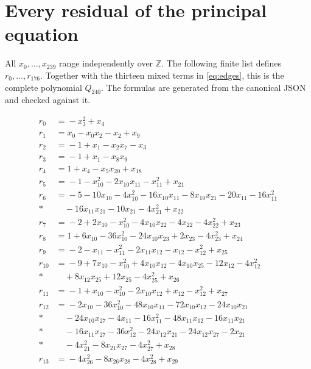 \documentclass[11pt]{article}
\theoremstyle{remark}\newtheorem{remark}[theorem]{Remark}
\newcommand{\Z}{\mathbb Z}
\begin{document}
\appendix
\section{Every residual of the principal equation}\label{app:residuals}

All $x_0,\ldots,x_{239}$ range independently over $\Z$.
The following finite list defines $r_0,\ldots,r_{176}$.
Together with the thirteen mixed terms in \eqref{eq:edges}, this is
the complete polynomial $Q_{240}$. The formulas are generated from
the canonical JSON and checked against it.

\begingroup\footnotesize
\setlength{\jot}{3pt}
\begin{align*}
r_{0}&={}-x_{3}^{2}+x_{4}\\[2pt]
r_{1}&={}x_{0}-x_{0}x_{2}-x_{2}+x_{9}\\[2pt]
r_{2}&={}-1+x_{1}-x_{2}x_{7}-x_{3}\\[2pt]
r_{3}&={}-1+x_{1}-x_{8}x_{9}\\[2pt]
r_{4}&={}1+x_{4}-x_{5}x_{20}+x_{18}\\[2pt]
r_{5}&={}-1-x_{10}^{2}-2x_{10}x_{11}-x_{11}^{2}+x_{21}\\[2pt]
r_{6}&={}-5-10x_{10}-4x_{10}^{2}-16x_{10}x_{11}-8x_{10}x_{21}-20x_{11}-16x_{11}^{2}\\*
&\quad{}-16x_{11}x_{21}-10x_{21}-4x_{21}^{2}+x_{22}\\[2pt]
r_{7}&={}-2+2x_{10}-x_{10}^{2}-4x_{10}x_{22}-4x_{22}-4x_{22}^{2}+x_{23}\\[2pt]
r_{8}&={}1+6x_{10}-36x_{10}^{2}-24x_{10}x_{23}+2x_{23}-4x_{23}^{2}+x_{24}\\[2pt]
r_{9}&={}-2-x_{11}-x_{11}^{2}-2x_{11}x_{12}-x_{12}-x_{12}^{2}+x_{25}\\[2pt]
r_{10}&={}-9+7x_{10}-x_{10}^{2}+4x_{10}x_{12}-4x_{10}x_{25}-12x_{12}-4x_{12}^{2}\\*
&\quad{}+8x_{12}x_{25}+12x_{25}-4x_{25}^{2}+x_{26}\\[2pt]
r_{11}&={}-1+x_{10}-x_{10}^{2}-2x_{10}x_{12}+x_{12}-x_{12}^{2}+x_{27}\\[2pt]
r_{12}&={}-2x_{10}-36x_{10}^{2}-48x_{10}x_{11}-72x_{10}x_{12}-24x_{10}x_{21}\\*
&\quad{}-24x_{10}x_{27}-4x_{11}-16x_{11}^{2}-48x_{11}x_{12}-16x_{11}x_{21}\\*
&\quad{}-16x_{11}x_{27}-36x_{12}^{2}-24x_{12}x_{21}-24x_{12}x_{27}-2x_{21}\\*
&\quad{}-4x_{21}^{2}-8x_{21}x_{27}-4x_{27}^{2}+x_{28}\\[2pt]
r_{13}&={}-4x_{26}^{2}-8x_{26}x_{28}-4x_{28}^{2}+x_{29}\\[2pt]

\end{align*}
\end{document}
